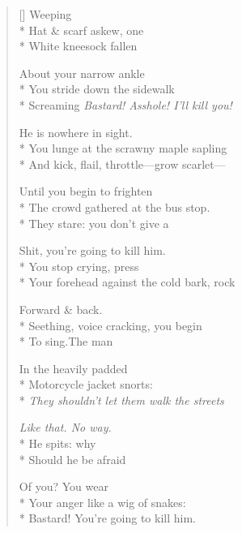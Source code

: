 \label{ch:medusa}
\settowidth{\versewidth}{And kick, flail, throttle---grow scarlet---}
\begin{verse}[\versewidth]
Weeping\\*
Hat \& scarf askew, one\\*
White kneesock fallen

About your narrow ankle\\*
You stride down the sidewalk\\*
Screaming \textit{Bastard! Asshole! I'll kill you!}

He is nowhere in sight.\\*
You lunge at the scrawny maple sapling\\*
And kick, flail, throttle---grow scarlet---

Until you begin to frighten\\*
The crowd gathered at the bus stop.\\*
They stare: you don't give a

Shit, you're going to kill him.\\*
You stop crying, press\\*
Your forehead against the cold bark, rock

Forward \& back.\\*
Seething, voice cracking, you begin\\*
To sing.\qquad The man

In the heavily padded\\*
Motorcycle jacket snorts:\\*
\textit{They shouldn't let them walk the streets}

\textit{Like that. \qquad No way.}\\*
He spits: why\\*
Should he be afraid

Of you? You wear\\*
Your anger like a wig of snakes:\\*
Bastard! You're going to kill him.
\end{verse}
